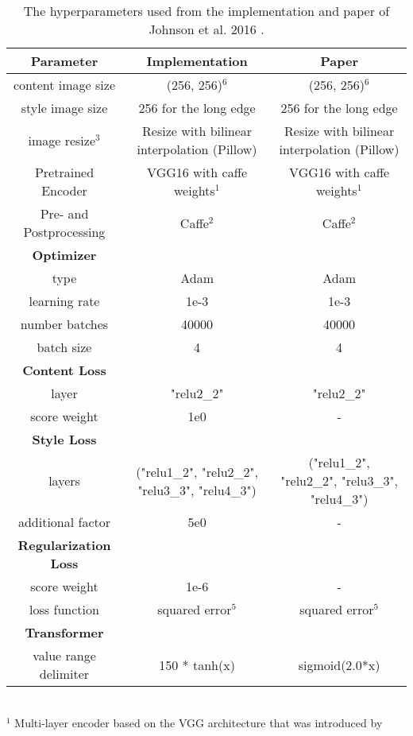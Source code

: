 \begin{landscape}
	\begin{table*}[!t]
		\renewcommand{\arraystretch}{1.0}
		\caption{The hyperparameters used from the implementation and paper of Johnson et al. 2016 \cite{JAL2016}.}
		\label{tab:JAL2016_parameters}
		\centering
		\begin{tabular}{c|c|c}
			\hline
			\bfseries Parameter & \bfseries Implementation & \bfseries Paper\\
			\hline\hline
			content image size & (256, 256)$^6$ & (256, 256)$^6$ \\
			style image size & 256 for the long edge & 256 for the long edge\\
			image resize$^3$ & Resize with bilinear interpolation (Pillow) & Resize with bilinear interpolation (Pillow)\\
			Pretrained Encoder & VGG16 with caffe weights$^1$ & VGG16 with caffe weights$^1$ \\
			Pre- and Postprocessing & Caffe$^2$ & Caffe$^2$\\
			\hline
			\bfseries Optimizer & &\\
			\hline
			type & Adam & Adam \\
			learning rate & 1e-3 & 1e-3 \\
			number batches & 40000 & 40000\\
			batch size & 4 & 4 \\
			\hline
			\bfseries  Content Loss & & \\
			\hline
			layer & "relu2\_2" & "relu2\_2" \\
			score weight & 1e0 & - \\
			\hline
			\bfseries  Style Loss & & \\
			\hline
			layers & ("relu1\_2", "relu2\_2", "relu3\_3", "relu4\_3")& ("relu1\_2", "relu2\_2", "relu3\_3", "relu4\_3")\\
			additional factor & 5e0 & - \\
			\hline
			\bfseries  Regularization Loss & & \\
			\hline
			score weight & 1e-6 & - \\
			loss function & squared error$^5$ & squared error$^5$ \\
			\hline
			\hline
			\bfseries  Transformer & & \\
			\hline
			value range delimiter & 150 * tanh(x) & sigmoid(2.0*x)\\
			\hline
		\end{tabular}
	\raggedright
		\footnotesize{
			\\$^1$ Multi-layer encoder based on the VGG architecture that was introduced by
}
\end{table*}
\end{landscape}
